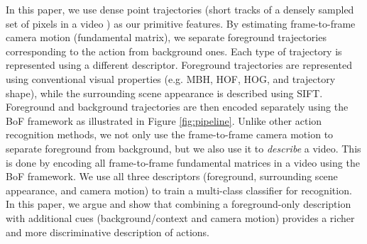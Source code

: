In this paper, we use dense point trajectories (short tracks of a densely sampled set of pixels in a video \cite{wang2013}) as our primitive features. By estimating frame-to-frame camera motion (fundamental matrix), we separate foreground trajectories corresponding to the action from background ones. Each type of trajectory is represented using a different descriptor. Foreground trajectories are represented using conventional visual properties (e.g. MBH, HOF, HOG, and trajectory shape), while the surrounding scene appearance is described using SIFT. Foreground and background trajectories are then encoded separately using the BoF framework as illustrated in Figure \ref{fig:pipeline}. Unlike other action recognition methods, we not only use the frame-to-frame camera motion to separate foreground from background, but we also use it to \emph{describe} a video. This is done by encoding all frame-to-frame fundamental matrices in a video using the BoF framework. We use all three descriptors (foreground, surrounding scene appearance, and camera motion) to train a multi-class classifier for recognition. In this paper, we argue and show that combining a foreground-only description \cite{wang2013} with additional cues (background/context and camera motion) provides a richer and more discriminative description of actions.




